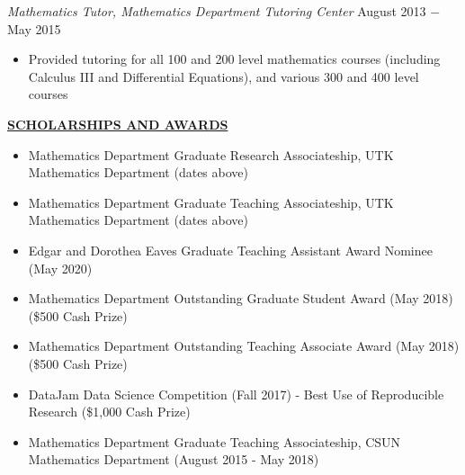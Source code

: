 \documentclass{article}
\begin{document}
\begin{itemize}[noitemsep,nolistsep,leftmargin=*]
\begin{itemize}[noitemsep,nolistsep,leftmargin=*]
        \end{itemize}
\end{itemize}

\noindent \textit{Mathematics Tutor, Mathematics Department Tutoring Center}
  \hfill August 2013 $-$ May 2015
\begin{itemize}[noitemsep,nolistsep,leftmargin=*]
    \item Provided tutoring for all 100 and 200 level mathematics courses (including Calculus III and Differential Equations), and various 300 and 400 level courses
\end{itemize}

\begin{center}
    \textbf{\underline{SCHOLARSHIPS AND AWARDS}}%
\end{center}
\begin{itemize}[noitemsep,nolistsep,leftmargin=*]
    \item Mathematics Department Graduate Research Associateship, UTK Mathematics Department (dates above)
    \item Mathematics Department Graduate Teaching Associateship, UTK Mathematics Department (dates above)
    \item Edgar and Dorothea Eaves Graduate Teaching Assistant Award Nominee (May 2020)
    \item Mathematics Department Outstanding Graduate Student Award (May 2018) (\$500 Cash Prize)
    \item Mathematics Department Outstanding Teaching Associate Award (May 2018) (\$500 Cash Prize)
    \item DataJam Data Science Competition (Fall 2017) - Best Use of Reproducible Research (\$1,000 Cash Prize)
    \item Mathematics Department Graduate Teaching Associateship, CSUN Mathematics Department (August 2015 - May 2018)
\end{itemize}
\end{document}
